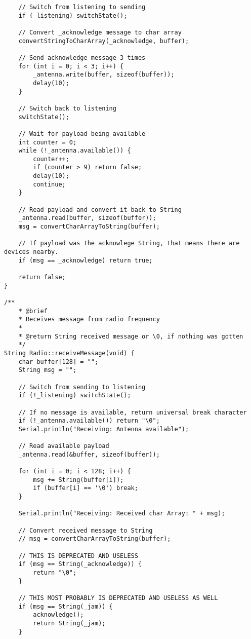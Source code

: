 \documentclass[a4paper, 11pt]{scrartcl}
\begin{document}
\begin{lstlisting}
    // Switch from listening to sending
    if (_listening) switchState();
    
    // Convert _acknowledge message to char array
    convertStringToCharArray(_acknowledge, buffer);

    // Send acknowledge message 3 times
    for (int i = 0; i < 3; i++) {
        _antenna.write(buffer, sizeof(buffer));
        delay(10);
    }

    // Switch back to listening
    switchState();

    // Wait for payload being available
    int counter = 0;
    while (!_antenna.available()) {
        counter++;
        if (counter > 9) return false;
        delay(10);
        continue;
    }

    // Read payload and convert it back to String
    _antenna.read(buffer, sizeof(buffer));
    msg = convertCharArrayToString(buffer);

    // If payload was the acknowlege String, that means there are devices nearby.
    if (msg == _acknowledge) return true;

    return false;
}

/**
    * @brief 
    * Receives message from radio frequency
    * 
    * @return String received message or \0, if nothing was gotten
    */
String Radio::receiveMessage(void) {
    char buffer[128] = "";
    String msg = "";

    // Switch from sending to listening
    if (!_listening) switchState();

    // If no message is available, return universal break character
    if (!_antenna.available()) return "\0";
    Serial.println("Receiving: Antenna available");

    // Read available payload
    _antenna.read(&buffer, sizeof(buffer));

    for (int i = 0; i < 128; i++) {
        msg += String(buffer[i]);
        if (buffer[i] == '\0') break;
    }

    Serial.println("Receiving: Received char Array: " + msg);

    // Convert received message to String
    // msg = convertCharArrayToString(buffer);

    // THIS IS DEPRECATED AND USELESS 
    if (msg == String(_acknowledge)) {
        return "\0";
    }

    // THIS MOST PROBABLY IS DEPRECATED AND USELESS AS WELL
    if (msg == String(_jam)) {
        acknowledge();
        return String(_jam);
    }


\end{lstlisting}
\end{document}
